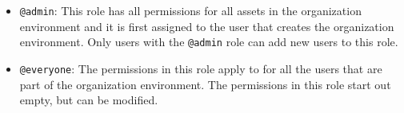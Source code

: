 \begin{itemize}
  \item \lstinline{@admin}: This role has all permissions for all assets in the
    organization environment and it is first assigned to the user that creates the organization environment.
    Only users with the \lstinline{@admin} role can add new users to this role.
  \item \lstinline{@everyone}: The permissions in this role apply to for all the users
    that are part of the organization environment. The permissions in this role start out
    empty, but can be modified.
\end{itemize}

